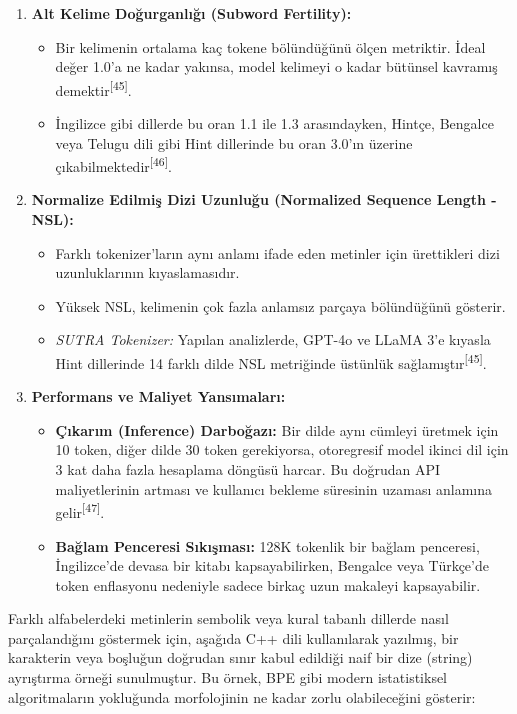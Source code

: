 \documentclass[11pt,a4paper]{article}
\begin{document}
\begin{enumerate}
  \item \textbf{Alt Kelime Doğurganlığı (Subword Fertility):}
\begin{itemize}
  \item Bir kelimenin ortalama kaç tokene bölündüğünü ölçen metriktir. İdeal değer 1.0'a ne kadar yakınsa, model kelimeyi o kadar bütünsel kavramış demektir\textsuperscript{[45]}.
  \item İngilizce gibi dillerde bu oran 1.1 ile 1.3 arasındayken, Hintçe, Bengalce veya Telugu dili gibi Hint dillerinde bu oran 3.0'ın üzerine çıkabilmektedir\textsuperscript{[46]}.
\end{itemize}
  \item \textbf{Normalize Edilmiş Dizi Uzunluğu (Normalized Sequence Length - NSL):}
\begin{itemize}
  \item Farklı tokenizer'ların aynı anlamı ifade eden metinler için ürettikleri dizi uzunluklarının kıyaslamasıdır.
  \item Yüksek NSL, kelimenin çok fazla anlamsız parçaya bölündüğünü gösterir.
  \item \textit{SUTRA Tokenizer:} Yapılan analizlerde, GPT-4o ve LLaMA 3'e kıyasla Hint dillerinde 14 farklı dilde NSL metriğinde üstünlük sağlamıştır\textsuperscript{[45]}.
\end{itemize}
  \item \textbf{Performans ve Maliyet Yansımaları:}
\begin{itemize}
  \item \textbf{Çıkarım (Inference) Darboğazı:} Bir dilde aynı cümleyi üretmek için 10 token, diğer dilde 30 token gerekiyorsa, otoregresif model ikinci dil için 3 kat daha fazla hesaplama döngüsü harcar. Bu doğrudan API maliyetlerinin artması ve kullanıcı bekleme süresinin uzaması anlamına gelir\textsuperscript{[47]}.
  \item \textbf{Bağlam Penceresi Sıkışması:} 128K tokenlik bir bağlam penceresi, İngilizce'de devasa bir kitabı kapsayabilirken, Bengalce veya Türkçe'de token enflasyonu nedeniyle sadece birkaç uzun makaleyi kapsayabilir.
\end{itemize}
\end{enumerate}
Farklı alfabelerdeki metinlerin sembolik veya kural tabanlı dillerde nasıl parçalandığını göstermek için, aşağıda C++ dili kullanılarak yazılmış, bir karakterin veya boşluğun doğrudan sınır kabul edildiği naif bir dize (string) ayrıştırma örneği sunulmuştur. Bu örnek, BPE gibi modern istatistiksel algoritmaların yokluğunda morfolojinin ne kadar zorlu olabileceğini gösterir:
\end{document}
